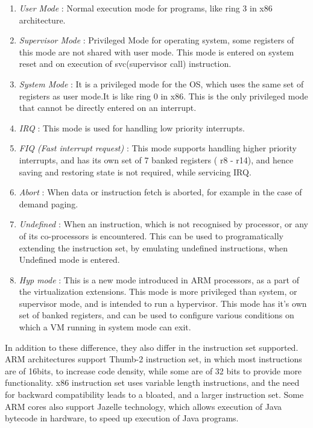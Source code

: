 \documentclass[a4paper,10pt]{article}
\begin{document}
\begin{enumerate}
\item \emph{\textmd{User Mode }}: Normal execution mode for programs, like ring 3 in x86 architecture.\\
\item \emph{\textmd{Supervisor Mode}} : Privileged Mode for operating system, some registers of this mode are not shared with user mode. This mode is entered on system reset and on execution of svc(supervisor call) instruction.\\
\item \emph{\textmd{System Mode }}: It is a privileged mode for the OS, which uses the same set of registers as user mode.It is like ring 0 in x86. This is the only privileged mode that cannot be directly entered on an interrupt.
\\
\item \emph{\textmd{IRQ}} : This mode is used for handling low priority interrupts.
\\
\item \emph{\textmd{FIQ (Fast interrupt request) }} : This mode supports handling higher priority interrupts, and has its own set of 7 banked registers ( r8 - r14), and hence saving and restoring state is not required, while servicing IRQ.
\\
\item \emph{\textmd{Abort }} : When data or instruction fetch is aborted, for example in the case of demand paging.
\\
\item \emph{\textmd{Undefined}} : When an instruction, which is not recognised by processor, or any of its co-processors is encountered. This can be used to programatically extending the instruction set, by emulating undefined instructions, when Undefined mode is entered.
\\
\item \emph{\textmd{Hyp mode}} : This is a new mode introduced in ARM processors, as a part of the virtualization extensions. This mode is more privileged than system, or supervisor mode, and is intended to run a hypervisor. This mode has it's own set of banked registers, and can be used to configure various conditions on which a VM running in system mode can exit.
\\
\end{enumerate}

In addition to these difference, they also differ in the instruction set supported. ARM architectures support Thumb-2 instruction set, in which most instructions are of 16bits, to increase code density, while some are of 32 bits to provide more functionality. x86 instruction set uses variable length instructions, and the need for backward compatibility leads to a bloated, and a larger instruction set. 
Some ARM cores also support Jazelle technology, which allows execution of Java bytecode in hardware, to speed up execution of Java programs.
\\\\
\end{document}
